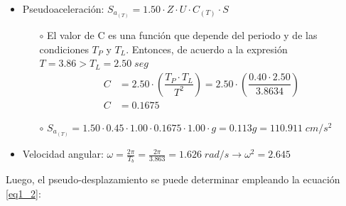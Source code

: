 \begin{itemize}
    \item Pseudoaceleración: $S_{a_{(T)}} = 1.50 \cdot Z \cdot U \cdot C_{(T)} \cdot S$
        \begin{itemize}
            \item [$\circ$] El valor de C es una función que depende del periodo y de las condiciones $T_P$ y $T_L$. Entonces, de acuerdo a la expresión $T = 3.86 > T_L = 2.50 \; seg$
            \begin{align*}
                C &= 2.50 \cdot \left( \dfrac{T_P \cdot T_L}{T^2} \right) = 2.50 \cdot \left( \dfrac{0.40 \cdot 2.50}{3.8634} \right) \\
                C &= 0.1675
            \end{align*}
            \item [$\circ$] $S_{a_{(T)}} = 1.50 \cdot 0.45 \cdot 1.00 \cdot 0.1675 \cdot 1.00 \cdot g = 0.113g = 110.911 \; cm/s^2$
        \end{itemize}
    \item Velocidad angular: $\omega = \frac{2\pi}{T_b} = \frac{2\pi}{3.863} = 1.626 \; rad/s \longrightarrow \omega^2 = 2.645$ 
    \end{itemize}

    Luego, el pseudo-desplazamiento se puede determinar empleando la ecuación \ref{eq1_2}:
    
